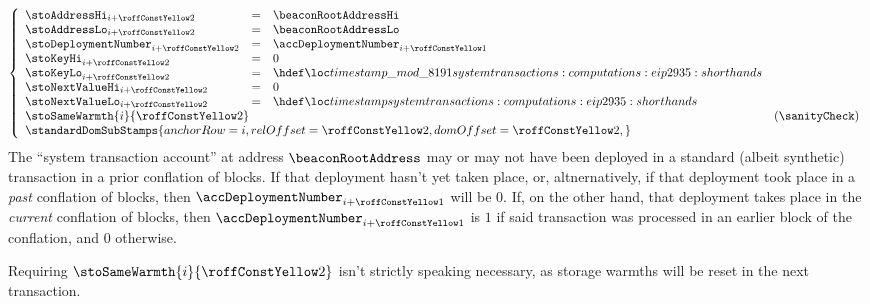 \item[\underline{\underline{Storing the \inst{TIMESTAMP} in the state:}}]
	\[
		\left\{ \begin{array}{lclr}
			\stoAddressHi        _{i + \roffTxSkipSysiBeaconRootSystemContractStorageSetTimestamp} & = & \beaconRootAddressHi          \\
			\stoAddressLo        _{i + \roffTxSkipSysiBeaconRootSystemContractStorageSetTimestamp} & = & \beaconRootAddressLo          \\
			\stoDeploymentNumber _{i + \roffTxSkipSysiBeaconRootSystemContractStorageSetTimestamp} & = & \accDeploymentNumber          _{i + \roffTxSkipSysiBeaconRootSystemContractAccount} \\
			\stoKeyHi            _{i + \roffTxSkipSysiBeaconRootSystemContractStorageSetTimestamp} & = & 0                             \\
			\stoKeyLo            _{i + \roffTxSkipSysiBeaconRootSystemContractStorageSetTimestamp} & = & \locLineaTimestampModuloPrime \\
			\stoNextValueHi      _{i + \roffTxSkipSysiBeaconRootSystemContractStorageSetTimestamp} & = & 0                             \\
			\stoNextValueLo      _{i + \roffTxSkipSysiBeaconRootSystemContractStorageSetTimestamp} & = & \locLineaTimestamp            \\
			\multicolumn{3}{l}{\stoSameWarmth  {i}{\roffTxSkipSysiBeaconRootSystemContractStorageSetTimestamp} } & (\sanityCheck)      \\
			\multicolumn{3}{l}{
				\standardDomSubStamps {
					anchorRow = i                                                          ,
					relOffset = \roffTxSkipSysiBeaconRootSystemContractStorageSetTimestamp ,
					domOffset = \roffTxSkipSysiBeaconRootSystemContractStorageSetTimestamp ,
				}} \\
		\end{array} \right.
	\]
	\saNote{} \label{hub: tx skip: sysi: eip 4788: deployment number of system contract}
	The ``system transaction account'' at address $\beaconRootAddress$ may or may not have been deployed
	in a standard (albeit synthetic) \user{} transaction in a prior conflation of blocks.
	If that deployment hasn't yet taken place, or, altnernatively,
	if that deployment took place in a \emph{past} conflation of blocks,
	then $\accDeploymentNumber _{i + \roffTxSkipSysiBeaconRootSystemContractAccount}$
	will be $0$.
	If, on the other hand, that deployment takes place in the \emph{current} conflation of blocks,
	then $\accDeploymentNumber _{i + \roffTxSkipSysiBeaconRootSystemContractAccount}$
	is $1$ if said transaction was processed in an earlier block of the conflation,
	and $0$ otherwise.

	\saNote{} \label{hub: tx skip: sysi: eip 4788: transaction processing: storage warmth constancy not strictly necessary}
	Requiring $\stoSameWarmth  {i}{\roffTxSkipSysiBeaconRootSystemContractStorageSetTimestamp} $ isn't
	strictly speaking necessary, as storage warmths will be reset in the next transaction.
